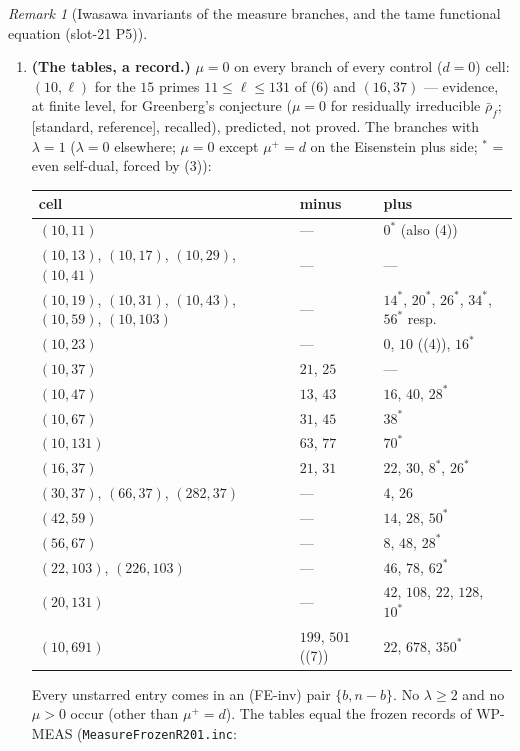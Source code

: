 \documentclass[11pt]{article}
\theoremstyle{remark}
\newtheorem{remark}[theorem]{Remark}
\newcommand{\STD}{\textsf{[standard, reference]}}
\begin{document}
\begin{remark}[Iwasawa invariants of the measure branches, and the tame functional equation (slot-21 P5)]
\begin{enumerate}
  (So the own irregular index \emph{is} seen by the minus measure, on the pole branches, as $\lambda(G_{b_0})-1$; a cell with $\lambda(G_{b_0})\ge2$, none known, would show $\lambda^{-}\ge1$ there.)
  $\mu^{+}=d$ on every plus branch (Remark~\ref{rmk:lvmeasplus}(ii); at $d=2$ through (5)).
\item \textbf{(The tables, a record.)} $\mu=0$ on every branch of every control ($d=0$) cell: $(10,\ell)$ for the $15$ primes $11\le\ell\le131$ of (6) and $(16,37)$ --- evidence, at finite level, for Greenberg's
  conjecture ($\mu=0$ for residually irreducible $\bar\rho_f$; \STD, recalled), predicted, not proved. The branches with $\lambda=1$ ($\lambda=0$ elsewhere; $\mu=0$ except $\mu^{+}=d$ on the Eisenstein plus side;
  $^{*}$ = even self-dual, forced by (3)):
  \begin{center}\footnotesize
  \begin{tabular}{@{}lll@{}}
  \toprule
  cell & minus & plus\\
  \midrule
  $(10,11)$ & --- & $0^{*}$ (also (4))\\
  $(10,13)$, $(10,17)$, $(10,29)$, $(10,41)$ & --- & ---\\
  $(10,19)$, $(10,31)$, $(10,43)$, $(10,59)$, $(10,103)$ & --- & $14^{*}$, $20^{*}$, $26^{*}$, $34^{*}$, $56^{*}$ resp.\\
  $(10,23)$ & --- & $0$, $10$ ((4)), $16^{*}$\\
  $(10,37)$ & $21$, $25$ & ---\\
  $(10,47)$ & $13$, $43$ & $16$, $40$, $28^{*}$\\
  $(10,67)$ & $31$, $45$ & $38^{*}$\\
  $(10,131)$ & $63$, $77$ & $70^{*}$\\
  $(16,37)$ & $21$, $31$ & $22$, $30$, $8^{*}$, $26^{*}$\\
  $(30,37)$, $(66,37)$, $(282,37)$ & --- & $4$, $26$\\
  $(42,59)$ & --- & $14$, $28$, $50^{*}$\\
  $(56,67)$ & --- & $8$, $48$, $28^{*}$\\
  $(22,103)$, $(226,103)$ & --- & $46$, $78$, $62^{*}$\\
  $(20,131)$ & --- & $42$, $108$, $22$, $128$, $10^{*}$\\
  $(10,691)$ & $199$, $501$ ((7)) & $22$, $678$, $350^{*}$\\
  \bottomrule
  \end{tabular}
  \end{center}
  Every unstarred entry comes in an (FE-inv) pair $\{b,n-b\}$. No $\lambda\ge2$ and no $\mu>0$ occur (other than $\mu^{+}=d$). The tables equal the frozen records of WP-MEAS (\texttt{MeasureFrozenR201.inc}:

\end{enumerate}
\end{remark}
\end{document}
